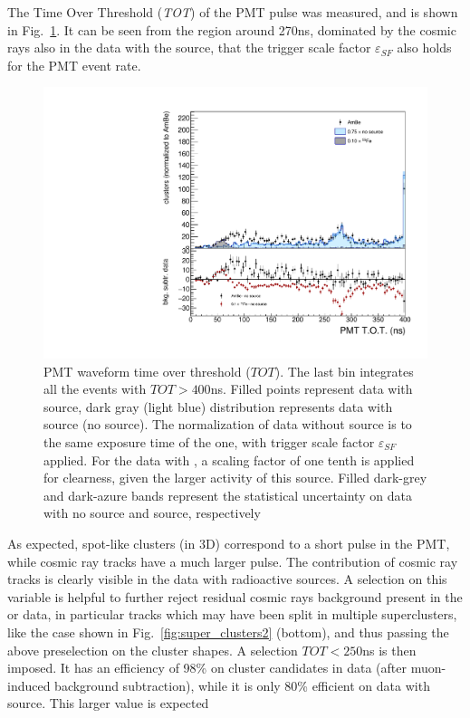 %
The Time Over Threshold (\textit{TOT}) of the PMT pulse was measured,
and is shown in Fig.~\ref{fig:pmttot}. It can be seen from the region
around 270\unit{ns}, dominated by the cosmic rays also in the data
with the \ambe source, that the trigger scale factor
$\varepsilon_{SF}$ also holds for the PMT event rate.
%
\begin{figure}[ht]
  \begin{center}
  \includegraphics[width=0.45\linewidth]{figures/pmt_tot}

   \caption{PMT waveform time over threshold ($TOT$).  The last bin
    integrates all the events with $TOT>400$\unit{ns}. Filled points
    represent data with \ambe source, dark gray (light blue)
    distribution represents data with \fe source (no source).  The
    normalization of data without source is to the same exposure time
    of the \ambe one, with trigger scale factor $\varepsilon_{SF}$
    applied. For the data with \fe, a scaling factor of one tenth is
    applied for clearness, given the larger activity of this
    source. Filled dark-grey and dark-azure
    bands represent the statistical uncertainty on data with no source
    and \fe source, respectively \label{fig:pmttot}}

  \end{center}
\end{figure}
%
As expected, spot-like clusters (in 3D) correspond to a short pulse in
the PMT, while cosmic ray tracks have a much larger pulse. The
contribution of cosmic ray tracks is clearly visible in the data with
radioactive sources. A selection on this variable is helpful to
further reject residual cosmic rays background present in the \ambe or
\fe data, in particular tracks which may have been split in multiple
superclusters, like the case shown in Fig.~\ref{fig:super_clusters2}
(bottom), and thus passing the above preselection on the cluster
shapes. A selection $TOT<250$\unit{ns} is then imposed.  It has an
efficiency of 98\% on cluster candidates in
\ambe data (after muon-induced background subtraction), while it is only 80\%
efficient on data with \fe source. This larger value is expected
